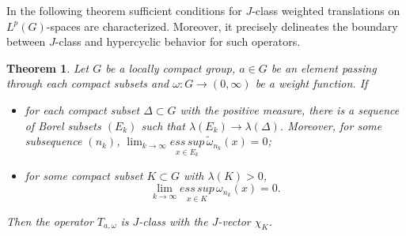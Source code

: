 \documentclass{amsart}
\newtheorem{thm}{Theorem}[section]
\theoremstyle{definition}\newtheorem{defn}[thm]{Definition}
\theoremstyle{remark}
\numberwithin{equation}{section}
\begin{document}
In the following theorem sufficient conditions for $J$-class
weighted translations on $L^p(G)$-spaces are characterized.
Moreover, it precisely delineates the boundary between $J$-class and
hypercyclic behavior for such operators.
\begin{thm}\label{t4}
Let $G$ be a locally compact group, $a\in G$ be an element passing
through  each compact subsets and $\omega:G\to (0,\infty)$ be a
weight function. If
\begin{itemize}
  \item [(i)]for each compact subset $\Delta \subset G$ with
the positive measure,  there is a sequence of Borel subsets $(E_k)$
such that $\lambda(E_k)\to\lambda(\Delta)$. Moreover, for some
subsequence $(n_k)$, $\lim_{k\rightarrow \infty}\underset{x\in
E_{k}}{ess\,sup}\,
 \tilde{\omega}_{n_k}(x)=0$;
  \item [(ii)] for some compact subset $K \subset G$ with
$\lambda(K)>0$,
 $$ \lim_{k\rightarrow \infty}\underset{x\in
K}{ess\,sup}\,
 {\omega}_{n_k}(x)=0.$$
\end{itemize}
Then the operator $T_{a,\omega}$ is $J$-class with the $J$-vector
$\chi_K$.
\end{thm}
\end{document}
